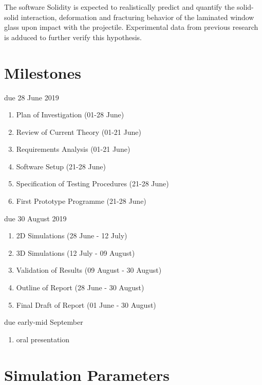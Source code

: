 \documentclass[12pt,twoside]{article}
\theoremstyle{break}
\begin{document}
The software Solidity is expected to realistically predict and quantify the solid-solid interaction, deformation and fracturing behavior of the laminated window glass upon impact with the projectile. Experimental data from previous research is adduced to further verify this hypothesis.

\section{Milestones}

due 28 June 2019

\begin{enumerate}
    \item Plan of Investigation (01-28 June)
    \item Review of Current Theory (01-21 June)
    \item Requirements Analysis (01-21 June)
    \item Software Setup (21-28 June)
    \item Specification of Testing Procedures (21-28 June)
    \item First Prototype Programme (21-28 June)
\end{enumerate}

\vspace{0.3cm}
due 30 August 2019 

\begin{enumerate}[resume]
    \item 2D Simulations (28 June - 12 July)
    \item 3D Simulations (12 July - 09 August)
    \item Validation of Results (09 August - 30 August)
    \item Outline of Report (28 June - 30 August)
    \item Final Draft of Report (01 June - 30 August)
\end{enumerate}

\vspace{0.3cm}
due early-mid September

\begin{enumerate}[resume]
    \item oral presentation
\end{enumerate}


\setlength{\bibsep}{5.0pt}


\appendix
\section{Simulation Parameters}
\label{ch:SimulationParameters}
\end{document}
